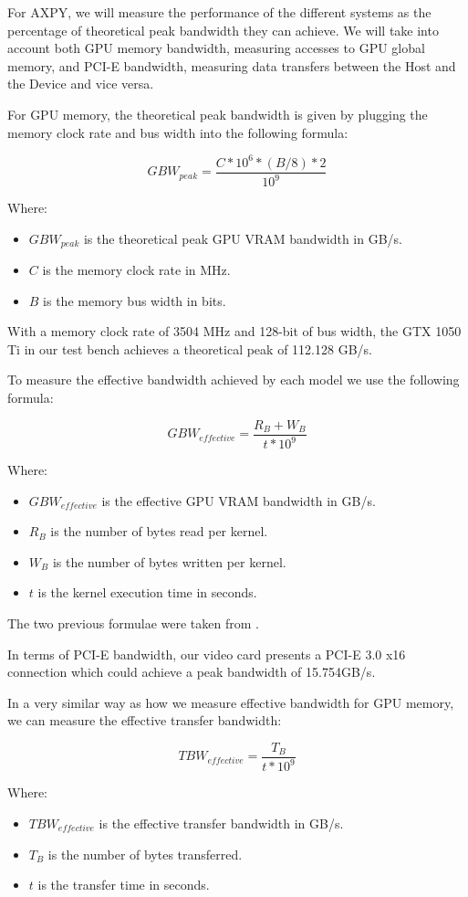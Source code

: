 For AXPY, we will measure the performance of the different systems as the percentage of theoretical peak bandwidth they can achieve. We will take into account both GPU memory bandwidth, measuring accesses to GPU global memory, and PCI-E bandwidth, measuring data transfers between the Host and the Device and vice versa.

For GPU memory, the theoretical peak bandwidth is given by plugging the memory clock rate and bus width into the following formula:

\[
    GBW_{peak} = \frac{C * 10^6 * (B/8) * 2}{10^9}
\]

Where:
\begin{itemize}
    \item $GBW_{peak}$ is the theoretical peak GPU VRAM bandwidth in GB/s.
    \item $C$ is the memory clock rate in MHz.
    \item $B$ is the memory bus width in bits.
\end{itemize}

With a memory clock rate of 3504 MHz and 128-bit of bus width, the GTX 1050 Ti in our test bench achieves a theoretical peak of 112.128 GB/s.

To measure the effective bandwidth achieved by each model we use the following formula:

\[
    GBW_{effective} = \frac{R_B + W_B}{t * 10^9}
\]

Where:
\begin{itemize}
    \item $GBW_{effective}$ is the effective GPU VRAM bandwidth in GB/s.
    \item $R_B$ is the number of bytes read per kernel.
    \item $W_B$ is the number of bytes written per kernel.
    \item $t$ is the kernel execution time in seconds.
\end{itemize}

The two previous formulae were taken from \cite{perf_metrics_cuda}.

In terms of PCI-E bandwidth, our video card presents a PCI-E 3.0 x16 connection which could achieve a peak bandwidth of 15.754GB/s.

In a very similar way as how we measure effective bandwidth for GPU memory, we can measure the effective transfer bandwidth:

\[
    TBW_{effective} = \frac{T_B}{t * 10^9}
\]

Where:
\begin{itemize}
    \item $TBW_{effective}$ is the effective transfer bandwidth in GB/s.
    \item $T_B$ is the number of bytes transferred.
    \item $t$ is the transfer time in seconds.
\end{itemize}

